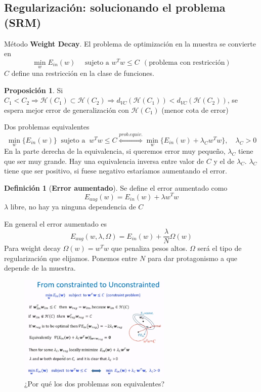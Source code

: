 \documentclass[11pt,a4paper]{article}
\theoremstyle{definition}
\newtheorem{definition}{Definición}[section]
\newtheorem{proposition}{Proposición}[section]
\begin{document}
	 \subsection{Regularización: solucionando el problema (SRM)}
	 Método \textbf{Weight Decay}. El problema de optimización en la muestra se convierte en
	 $$\min_w E_{in}(w) \quad \text{ sujeto a } w^Tw\leq C \ \ (\text{problema con restricción})$$
	 $C$ define una restricción en la clase de funciones.
	\begin{proposition}
		Si $C_1<C_2 \Rightarrow \mathcal{H}(C_1)\subset \mathcal{H}(C_2) \Rightarrow d_{VC}(\mathcal{H}(C_1))<d_{VC}(\mathcal{H}(C_2))$, se espera mejor error de generalización con $\mathcal{H}(C_1)$ (menor cota de error)
	\end{proposition}
	Dos problemas equivalentes
	$$\min_w \{E_{in}(w)\} \ \text{ sujeto a } \ w^Tw\leq C \stackrel{prob. equiv.}{\Longleftrightarrow} \min_w \{E_{in}(w) + \lambda_C w^Tw\}, \quad \lambda_C>0$$
	En la parte derecha de la equivalencia, si queremos error muy pequeño, $\lambda_C$ tiene que ser muy grande. Hay una equivalencia inversa entre valor de $C$ y el de $\lambda_C$. $\lambda_C$ tiene que ser positivo, si fuese negativo estaríamos aumentando el error.
	\begin{definition}[\textbf{Error aumentado}]
	Se define el error aumentado como
	$$E_{aug}(w)=E_{in}(w)+\lambda w^Tw$$
	$\lambda$ libre, no hay ya ninguna dependencia de $C$
	\end{definition}
	En general el error aumentado es
	$$E_{aug}(w,\lambda,\Omega)=E_{in}(w)+\frac{\lambda}{N} \Omega(w)$$
	Para weight decay $\Omega(w)=w^Tw$ que penaliza pesos altos. $\Omega$ será el tipo de regularización que elijamos. Ponemos entre $N$ para dar protagonismo a que depende de la muestra.
	\begin{figure}[H]
		\centering
		\includegraphics[width=0.65\textwidth]{images/const_to_unconst}
		\caption{¿Por qué los dos problemas son equivalentes?}
	\end{figure}
	
\end{document}
